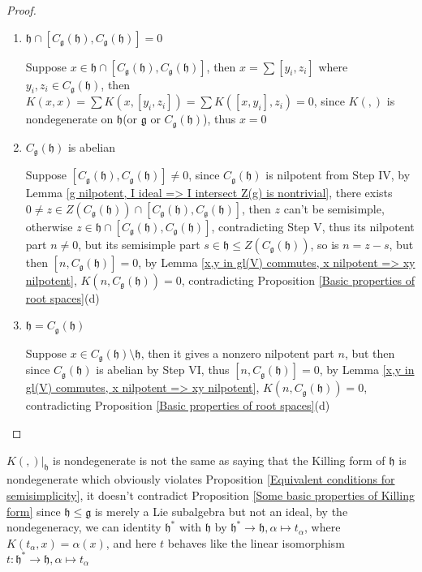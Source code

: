 \documentclass[main]{subfiles}
\begin{document}
\begin{proof}
\begin{enumerate}[leftmargin=*,label=\textit{Step \Roman*:}]
\item $\mathfrak{h}\cap[C_{\mathfrak{g}}(\mathfrak{h}),C_{\mathfrak{g}}(\mathfrak{h})]=0$ \par
Suppose $x\in\mathfrak{h}\cap[C_{\mathfrak{g}}(\mathfrak{h}),C_{\mathfrak{g}}(\mathfrak{h})]$, then $x=\sum[y_i,z_i]$ where $y_i,z_i\in C_{\mathfrak{g}}(\mathfrak{h})$, then $K(x,x)=\sum K(x,[y_i,z_i])=\sum K([x,y_i],z_i)=0$, since $K(,)$ is nondegenerate on $\mathfrak{h}$(or $\mathfrak{g}$ or $C_{\mathfrak{g}}(\mathfrak{h})$), thus $x=0$
\item $C_{\mathfrak{g}}(\mathfrak{h})$ is abelian \par
Suppose $[C_{\mathfrak{g}}(\mathfrak{h}),C_{\mathfrak{g}}(\mathfrak{h})]\neq0$, since $C_{\mathfrak{g}}(\mathfrak{h})$ is nilpotent from Step IV, by Lemma \ref{g nilpotent, I ideal => I intersect Z(g) is nontrivial}, there exists $0\neq z\in Z(C_{\mathfrak{g}}(\mathfrak{h}))\cap[C_{\mathfrak{g}}(\mathfrak{h}),C_{\mathfrak{g}}(\mathfrak{h})]$, then $z$ can't be semisimple, otherwise $z\in\mathfrak{h}\cap[C_{\mathfrak{g}}(\mathfrak{h}),C_{\mathfrak{g}}(\mathfrak{h})]$, contradicting Step V, thus its nilpotent part $n\neq0$, but its semisimple part $s\in\mathfrak{h}\leq Z(C_{\mathfrak{g}}(\mathfrak{h}))$, so is $n=z-s$, but then $[n,C_{\mathfrak{g}}(\mathfrak{h})]=0$, by Lemma \ref{x,y in gl(V) commutes, x nilpotent => xy nilpotent}, $K(n,C_{\mathfrak{g}}(\mathfrak{h}))=0$, contradicting Proposition \ref{Basic properties of root spaces}(d)
\item $\mathfrak{h}=C_{\mathfrak{g}}(\mathfrak{h})$ \par
Suppose $x\in C_{\mathfrak{g}}(\mathfrak{h})\setminus\mathfrak{h}$, then it gives a nonzero nilpotent part $n$, but then since $C_{\mathfrak{g}}(\mathfrak{h})$ is abelian by Step VI, thus $[n,C_{\mathfrak{g}}(\mathfrak{h})]=0$, by Lemma \ref{x,y in gl(V) commutes, x nilpotent => xy nilpotent}, $K(n,C_{\mathfrak{g}}(\mathfrak{h}))=0$, contradicting Proposition \ref{Basic properties of root spaces}(d)
\end{enumerate}
\end{proof}

\begin{remark}
$K(,)|_\mathfrak{h}$ is nondegenerate is not the same as saying that the Killing form of $\mathfrak{h}$ is nondegenerate which obviously violates Proposition \ref{Equivalent conditions for semisimplicity}, it doesn't contradict Proposition \ref{Some basic properties of Killing form} since $\mathfrak{h}\leq\mathfrak{g}$ is merely a Lie subalgebra but not an ideal, by the nondegeneracy, we can identity $\mathfrak{h}^*$ with $\mathfrak{h}$ by $\mathfrak{h}^*\to\mathfrak{h},\alpha\mapsto t_\alpha$, where $K(t_\alpha,x)=\alpha(x)$, and here $t$ behaves like the linear isomorphism $t:\mathfrak{h}^*\to\mathfrak{h}, \alpha\mapsto t_\alpha$
\end{remark}
\end{document}
